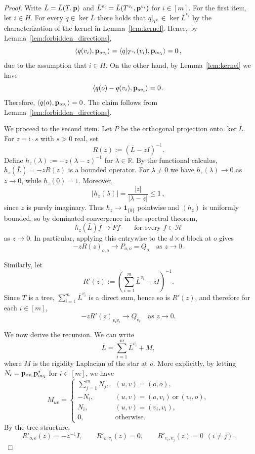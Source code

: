 \documentclass[reqno,english]{amsart}
\numberwithin{equation}{section}
\theoremstyle{definition}{
\newtheorem{example}[theorem]{Example}
\newtheorem{definition}[theorem]{Definition}
\newtheorem*{definition*}{Definition}
\newtheorem{problem}[theorem]{Problem}
\newtheorem{question}[theorem]{Question}
}
\newcommand{\R}{\mathbb R}
\newcommand{\cH}{\mathcal H}
\newcommand{\ii}{\mathrm{i}}
\newcommand{\p}{{\bf p}}
\begin{document}
\begin{proof}
Write $\bar L=\bar L(T,\p)$ and $\bar L^{v_i}=\bar L(T^{v_i},\p^{v_i})$ for $i\in[m]$.
For the first item, let $i\in H$. For every $q\in\ker\bar L$ there holds that $q|_{T^{v_i}}\in\ker \bar L^{v_i}$ by
the characterization of the kernel in Lemma~\ref{lem:kernel}. Hence, by Lemma~\ref{lem:forbidden_directions},
\[
\langle q(v_i),\p_{ov_i}\rangle=\langle q|_{T^{v_i}}(v_i),\p_{ov_i}\rangle=0\,,
\]
due to the assumption that $i\in H$. On the other hand, by Lemma~\ref{lem:kernel} we have
\[
\langle q(o)-q(v_i),\p_{ov_i}\rangle=0\,.
\]
Therefore, $\langle q(o),\p_{ov_i}\rangle=0$. The claim follows from Lemma~\ref{lem:forbidden_directions}.

We proceed to the second item. Let $P$ be the orthogonal projection onto $\ker\bar L$.
For $z=\ii\cdot s$ with $s>0$ real, set
\[
R(z):=(\bar L-zI)^{-1}.
\]
Define $h_z(\lambda):=-z(\lambda-z)^{-1}$ for $\lambda\in\R$. By the functional calculus,
$h_z(\bar L)=-zR(z)$ is a bounded operator. For $\lambda\neq 0$ we have $h_z(\lambda)\to 0$ as $z\to 0$, while $h_z(0)=1$.
Moreover,
\[
|h_z(\lambda)|=\frac{|z|}{|\lambda-z|}\le 1\,,
\]
since $z$ is purely imaginary. Thus $h_z\to \mathbf 1_{\{0\}}$ pointwise and $(h_z)$ is uniformly bounded, so by dominated
convergence in the spectral theorem,
\[
h_z(\bar L)f\to Pf\qquad\text{for every }f\in\cH
\]
as $z\to 0$. In particular, applying this entrywise to the $d\times d$ block at $o$ gives
\[
-zR(z)_{o,o}\to P_{o,o}=Q_o\quad \mbox{as }z\to 0.
\]

Similarly, let
\[
R'(z):=\left(\sum_{i=1}^m \bar L^{v_i}-zI\right)^{-1}.
\]
Since $T$ is a tree, $\sum_{i=1}^m\bar L^{v_i}$ is a direct sum, hence so is $R'(z)$, and therefore for each $i\in[m]$,
\[
-zR'(z)_{v_iv_i}\to Q_{v_i}
\quad \mbox{as }z\to 0.
\]

We now derive the recursion. We can write
\[
\bar L=\sum_{i=1}^m \bar L^{v_i}+M,
\]
where $M$ is the rigidity Laplacian of the star at $o$. 
More explicitly, by letting $N_i=\p_{ov_i}\p_{ov_i}^*$ for $i\in [m]$, we have
\[
M_{uv}=
\begin{cases}
\sum_{j=1}^m N_j, & (u,v)=(o,o),\\
-N_i, & (u,v)=(o,v_i)\ \text{or}\ (v_i,o),\\
N_i, & (u,v)=(v_i,v_i),\\
0, & \text{otherwise}.
\end{cases}
\]
By the tree structure,
\begin{equation}\label{eq:Rprime_blocks}
R'_{o,o}(z)=-z^{-1}I,\qquad R'_{o,v_i}(z)=0,\qquad R'_{v_i,v_j}(z)=0\ \ (i\neq j).
\end{equation}


\end{proof}
\end{document}
